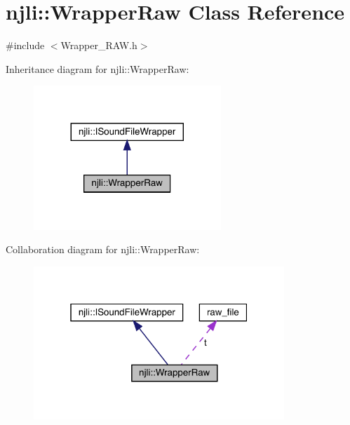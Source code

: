 \hypertarget{classnjli_1_1_wrapper_raw}{}\section{njli\+:\+:Wrapper\+Raw Class Reference}
\label{classnjli_1_1_wrapper_raw}


{\ttfamily \#include $<$Wrapper\+\_\+\+R\+A\+W.\+h$>$}



Inheritance diagram for njli\+:\+:Wrapper\+Raw\+:\nopagebreak
\begin{figure}[H]
\begin{center}
\leavevmode
\includegraphics[width=200pt]{classnjli_1_1_wrapper_raw__inherit__graph}
\end{center}
\end{figure}


Collaboration diagram for njli\+:\+:Wrapper\+Raw\+:\nopagebreak
\begin{figure}[H]
\begin{center}
\leavevmode
\includegraphics[width=268pt]{classnjli_1_1_wrapper_raw__coll__graph}
\end{center}
\end{figure}
